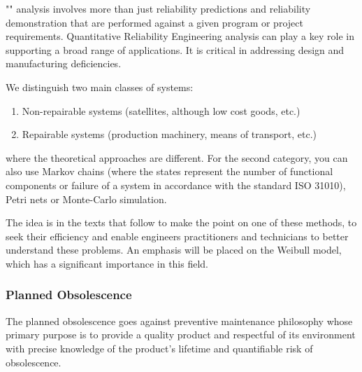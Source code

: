 	"" analysis involves more than just reliability predictions and reliability demonstration that are performed against a given program or project requirements. Quantitative Reliability Engineering analysis can play a key role in supporting a broad range of applications. It is critical in addressing design and manufacturing deficiencies.
	
	We distinguish two main classes of systems:
	\begin{enumerate}		
		\item Non-repairable systems (satellites, although low cost goods, etc.)
		\item Repairable systems (production machinery, means of transport, etc.)
	\end{enumerate}
	where the theoretical approaches are different. For the second category, you can also use Markov chains (where the states represent the number of functional components or failure of a system in accordance with the standard ISO 31010), Petri nets or Monte-Carlo simulation.
		
	The idea is in the texts that follow to make the point on one of these methods, to seek their efficiency and enable engineers practitioners and technicians to better understand these problems. An emphasis will be placed on the Weibull model, which has a significant importance in this field.
		
	\subsubsection{Planned Obsolescence}
	The planned obsolescence goes against preventive maintenance philosophy whose primary purpose is to provide a quality product and respectful of its environment with precise knowledge of the product's lifetime and quantifiable risk of obsolescence.
		
